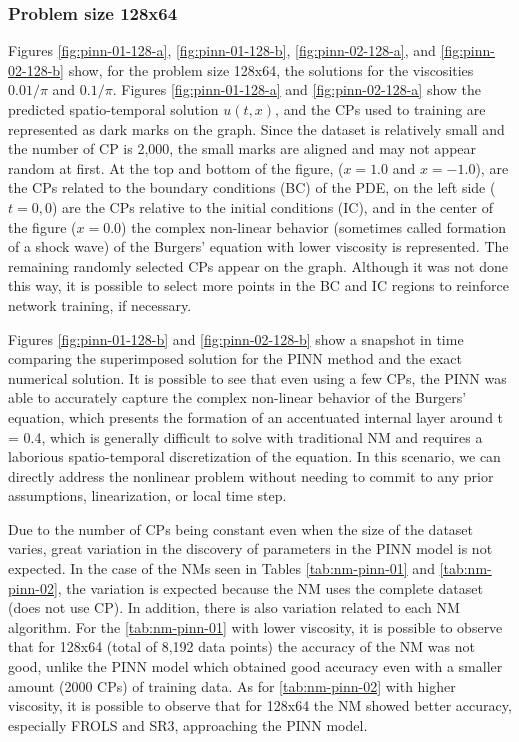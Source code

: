 \documentclass[conference]{IEEEtran}
\begin{document}
\subsubsection{Problem size 128x64}

Figures \ref{fig:pinn-01-128-a}, \ref{fig:pinn-01-128-b}, \ref{fig:pinn-02-128-a}, and \ref{fig:pinn-02-128-b} show, for the problem size 128x64, the solutions for the viscosities ${0.01}/{\pi}$ and ${0.1}/{\pi}$. 
Figures \ref{fig:pinn-01-128-a} and \ref{fig:pinn-02-128-a} show the predicted spatio-temporal solution $u(t, x)$, and the CPs used to training are represented as dark marks on the graph.
Since the dataset is relatively small and the number of CP is 2,000, the small marks are aligned and may not appear random at first. 
At the top and bottom of the figure, ($x=1.0$ and $x=-1.0$), are the CPs related to the boundary conditions (BC) of the PDE, on the left side ($t=0, 0$) are the CPs relative to the initial conditions (IC), and in the center of the figure ($x=0.0$) the complex non-linear behavior (sometimes called formation of a shock wave) of the Burgers' equation with lower viscosity is represented.
The remaining randomly selected CPs appear on the graph. Although it was not done this way, it is possible to select more points in the BC and IC regions to reinforce network training, if necessary.

Figures \ref{fig:pinn-01-128-b} and \ref{fig:pinn-02-128-b} show a snapshot in time comparing the superimposed solution for the PINN method and the exact numerical solution.
It is possible to see that even using a few CPs, the PINN was able to accurately capture the complex non-linear behavior of the Burgers' equation, which presents the formation of an accentuated internal layer around t = 0.4, which is generally difficult to solve with traditional NM and requires a laborious spatio-temporal discretization of the equation. 
In this scenario, we can directly address the nonlinear problem without needing to commit to any prior assumptions, linearization, or local time step.

Due to the number of CPs being constant even when the size of the dataset varies, great variation in the discovery of parameters in the PINN model is not expected. In the case of the NMs seen in Tables \ref{tab:nm-pinn-01} and \ref {tab:nm-pinn-02}, the variation is expected because the NM uses the complete dataset (does not use CP). 
In addition, there is also variation related to each NM algorithm.
For the \autoref{tab:nm-pinn-01} with lower viscosity, it is possible to observe that for 128x64 (total of 8,192 data points) the accuracy of the NM was not good, unlike the PINN model which obtained good accuracy even with a smaller amount (2000 CPs) of training data.
As for \autoref{tab:nm-pinn-02} with higher viscosity, it is possible to observe that for 128x64 the NM showed better accuracy, especially FROLS and SR3, approaching the PINN model.
\end{document}
